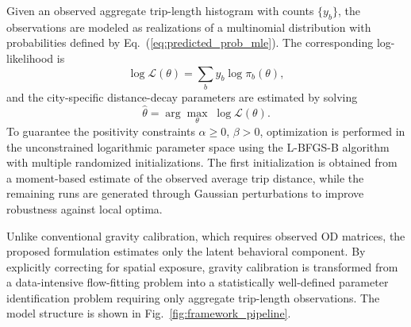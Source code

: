 Given an observed aggregate trip-length histogram with counts $\{y_b\}$, the observations are modeled as realizations of a multinomial distribution with probabilities defined by Eq.~(\ref{eq:predicted_prob_mle}). The corresponding log-likelihood is
\begin{equation}\label{eq:likelihood_mle}
\log \mathcal{L}(\theta) = \sum_b y_b \log \pi_b(\theta),
\end{equation}
and the city-specific distance-decay parameters are estimated by solving
\begin{equation}
\hat{\theta} = \arg\max_{\theta}\; \log \mathcal{L}(\theta).
\end{equation}
To guarantee the positivity constraints $\alpha \ge 0$, $\beta > 0$, optimization is performed in the unconstrained logarithmic parameter space using the L-BFGS-B algorithm with multiple randomized initializations. The first initialization is obtained from a moment-based estimate of the observed average trip distance, while the remaining runs are generated through Gaussian perturbations to improve robustness against local optima.

Unlike conventional gravity calibration, which requires observed OD matrices, the proposed formulation estimates only the latent behavioral component. By explicitly correcting for spatial exposure, gravity calibration is transformed from a data-intensive flow-fitting problem into a statistically well-defined parameter identification problem requiring only aggregate trip-length observations. The model structure is shown in Fig.~\ref{fig:framework_pipeline}.

